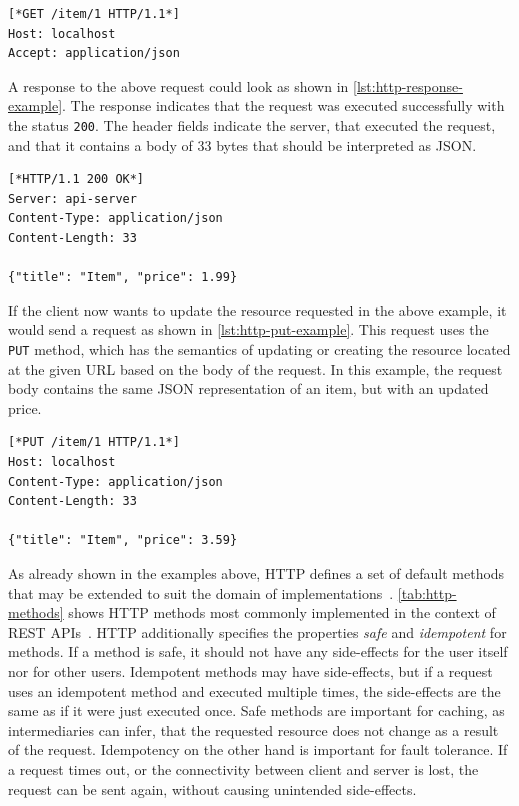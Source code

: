 \begin{lstlisting}[caption={\acs{HTTP} GET Request}, showlines=true, label=lst:http-get-example, language=http]
[*GET /item/1 HTTP/1.1*]
Host: localhost
Accept: application/json

\end{lstlisting}

A response to the above request could look as shown in \autoref{lst:http-response-example}.
The response indicates that the request was executed successfully with the status \texttt{200}.
The header fields indicate the server, that executed the request, and that it contains a body of 33 bytes that should be interpreted as \ac{JSON}.

\begin{lstlisting}[caption={\acs{HTTP} Response to GET Request}, label=lst:http-response-example, language=http]
[*HTTP/1.1 200 OK*]
Server: api-server
Content-Type: application/json
Content-Length: 33

{"title": "Item", "price": 1.99}
\end{lstlisting}

If the client now wants to update the resource requested in the above example, it would send a request as shown in \autoref{lst:http-put-example}.
This request uses the \texttt{PUT} method, which has the semantics of updating or creating the resource located at the given \ac{URL} based on the body of the request.
In this example, the request body contains the same \ac{JSON} representation of an item, but with an updated price.

\begin{lstlisting}[caption={\acs{HTTP} PUT Request}, label=lst:http-put-example, language=http]
[*PUT /item/1 HTTP/1.1*]
Host: localhost
Content-Type: application/json
Content-Length: 33

{"title": "Item", "price": 3.59}
\end{lstlisting}

As already shown in the examples above, \ac{HTTP} defines a set of default methods that may be extended to suit the domain of implementations~\cite{RFC2068}.
\autoref{tab:http-methods} shows \ac{HTTP} methods most commonly implemented in the context of \ac{REST} \acp{API}~\cite{Buelthoff2019}.
\ac{HTTP} additionally specifies the properties \textit{safe} and \textit{idempotent} for methods.
If a method is safe, it should not have any side-effects for the user itself nor for other users.
Idempotent methods may have side-effects, but if a request uses an idempotent method and executed multiple times, the side-effects are the same as if it were just executed once.
Safe methods are important for caching, as intermediaries can infer, that the requested resource does not change as a result of the request.
Idempotency on the other hand is important for fault tolerance.
If a request times out, or the connectivity between client and server is lost, the request can be sent again, without causing unintended side-effects.

